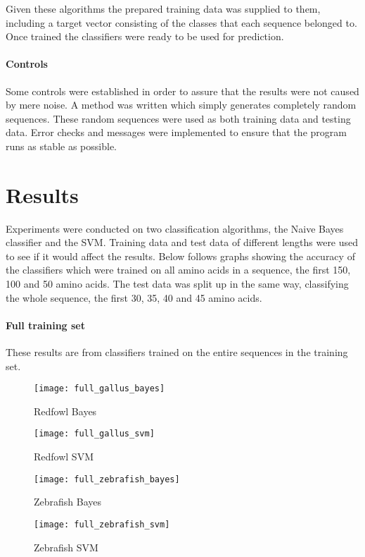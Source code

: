 \documentclass[10pt,letterpaper]{article}
\begin{document}
Given these algorithms the prepared training data was supplied to them, including a target vector consisting of the classes that each sequence belonged to. Once trained the classifiers were ready to be used for prediction. 

\paragraph*{Controls}
Some controls were established in order to assure that the results were not caused by mere noise. A method was written which simply generates completely random sequences. These random sequences were used as both training data and testing data. Error checks and messages were implemented to ensure that the program runs as stable as possible. 

\section*{Results}
Experiments were conducted on two classification algorithms, the Naive Bayes classifier and the SVM. Training data and test data of different lengths were used to see if it would affect the results. Below follows graphs showing the accuracy of the classifiers which were trained on all amino acids in a sequence, the first 150, 100 and 50 amino acids. The test data was split up in the same way, classifying the whole sequence, the first 30, 35, 40 and 45 amino acids. 

\paragraph*{Full training set} These results are from classifiers trained on the entire sequences in the training set. 
\begin{figure}[H] 
  \label{fig7} 
  \begin{minipage}[b]{0.6\linewidth}
    \texttt{[image: full\_gallus\_bayes]} 
    \caption{Redfowl Bayes} 
    \vspace{4ex}
  \end{minipage}%
  \begin{minipage}[b]{0.6\linewidth}
    \texttt{[image: full\_gallus\_svm]} 
    \caption{Redfowl SVM} 
    \vspace{4ex}
  \end{minipage} 
  \begin{minipage}[b]{0.6\linewidth}
    \texttt{[image: full\_zebrafish\_bayes]} 
    \caption{Zebrafish Bayes} 
    \vspace{4ex}
  \end{minipage}%
  \begin{minipage}[b]{0.6\linewidth}
    \texttt{[image: full\_zebrafish\_svm]} 
    \caption{Zebrafish SVM} 
    \vspace{4ex}
  \end{minipage} 
\end{figure}
\end{document}
